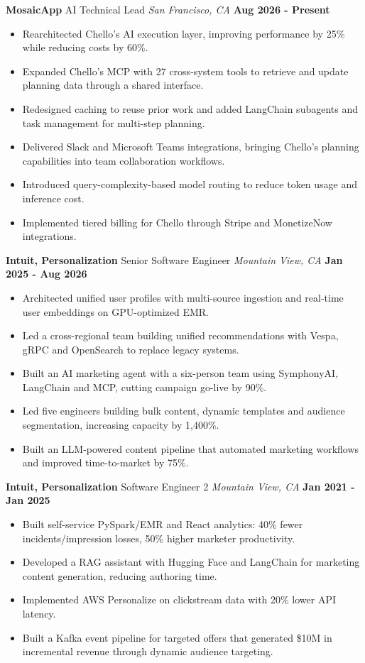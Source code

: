 \documentclass[10pt, letterpaper]{article}
\newcommand{\jobentry}[4]{
  \noindent\textbf{#1} \hfill #2 \hfill \textit{#3} \hfill \textbf{#4}
}
\begin{document}
\jobentry{MosaicApp}{AI Technical Lead}{San Francisco, CA}{Aug 2026 - Present}
\begin{itemize}
	\item Rearchitected Chello's AI execution layer, improving performance by 25\% while reducing costs by 60\%.
	\item Expanded Chello's MCP with 27 cross-system tools to retrieve and update planning data through a shared interface.
	\item Redesigned caching to reuse prior work and added LangChain subagents and task management for multi-step planning.
	\item Delivered Slack and Microsoft Teams integrations, bringing Chello's planning capabilities into team collaboration workflows.
	\item Introduced query-complexity-based model routing to reduce token usage and inference cost.
	\item Implemented tiered billing for Chello through Stripe and MonetizeNow integrations.
\end{itemize}

\jobentry{Intuit, Personalization}{Senior Software Engineer}{Mountain View, CA}{Jan 2025 - Aug 2026}
\begin{itemize}
	\item Architected unified user profiles with multi-source ingestion and real-time user embeddings on GPU-optimized EMR.
	\item Led a cross-regional team building unified recommendations with Vespa, gRPC and OpenSearch to replace legacy systems.
	\item Built an AI marketing agent with a six-person team using SymphonyAI, LangChain and MCP, cutting campaign go-live by 90\%.
	\item Led five engineers building bulk content, dynamic templates and audience segmentation, increasing capacity by 1,400\%.
	\item Built an LLM-powered content pipeline that automated marketing workflows and improved time-to-market by 75\%.
\end{itemize}

\jobentry{Intuit, Personalization}{Software Engineer 2}{Mountain View, CA}{Jan 2021 - Jan 2025}
\begin{itemize}
	\item Built self-service PySpark/EMR and React analytics: 40\% fewer incidents/impression losses, 50\% higher marketer productivity.
	\item Developed a RAG assistant with Hugging Face and LangChain for marketing content generation, reducing authoring time.
	\item Implemented AWS Personalize on clickstream data with 20\% lower API latency.
	\item Built a Kafka event pipeline for targeted offers that generated \$10M in incremental revenue through dynamic audience targeting.
\end{itemize}
\end{document}
